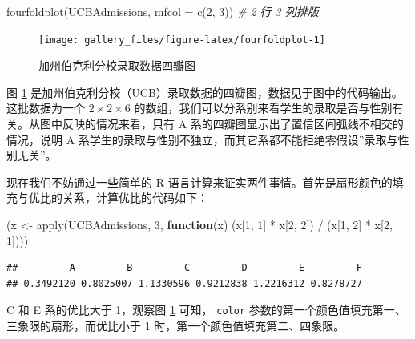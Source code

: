 \documentclass[
  b5paper,
  UTF8,twoside]{book}
\newenvironment{Shaded}{\begin{snugshade}}{\end{snugshade}}
\newcommand{\AttributeTok}[1]{\textcolor[rgb]{0.77,0.63,0.00}{#1}}
\newcommand{\CommentTok}[1]{\textcolor[rgb]{0.56,0.35,0.01}{\textit{#1}}}
\newcommand{\ControlFlowTok}[1]{\textcolor[rgb]{0.13,0.29,0.53}{\textbf{#1}}}
\newcommand{\DecValTok}[1]{\textcolor[rgb]{0.00,0.00,0.81}{#1}}
\newcommand{\FunctionTok}[1]{\textcolor[rgb]{0.00,0.00,0.00}{#1}}
\newcommand{\NormalTok}[1]{#1}
\newcommand{\OtherTok}[1]{\textcolor[rgb]{0.56,0.35,0.01}{#1}}
\newcommand{\SpecialCharTok}[1]{\textcolor[rgb]{0.00,0.00,0.00}{#1}}
\begin{document}
\begin{Shaded}
\begin{Highlighting}[]
\FunctionTok{fourfoldplot}\NormalTok{(UCBAdmissions, }\AttributeTok{mfcol =} \FunctionTok{c}\NormalTok{(}\DecValTok{2}\NormalTok{, }\DecValTok{3}\NormalTok{)) }\CommentTok{\# 2 行 3 列排版}
\end{Highlighting}
\end{Shaded}

\begin{figure}

{\centering \texttt{[image: gallery\_files/figure-latex/fourfoldplot-1]} 

}

\caption[加州伯克利分校录取数据四瓣图]{加州伯克利分校录取数据四瓣图}\label{fig:fourfoldplot}
\end{figure}

图 \ref{fig:fourfoldplot} 是加州伯克利分校（UCB）录取数据的四瓣图，数据见于图中的代码输出。这批数据为一个 \(2\times2\times6\) 的数组，我们可以分系别来看学生的录取是否与性别有关。从图中反映的情况来看，只有 A 系的四瓣图显示出了置信区间弧线不相交的情况，说明 A 系学生的录取与性别不独立，而其它系都不能拒绝零假设''录取与性别无关''。

现在我们不妨通过一些简单的 R 语言计算来证实两件事情。首先是扇形颜色的填充与优比的关系，计算优比的代码如下：

\begin{Shaded}
\begin{Highlighting}[]
\NormalTok{(x }\OtherTok{\textless{}{-}} \FunctionTok{apply}\NormalTok{(UCBAdmissions, }\DecValTok{3}\NormalTok{, }\ControlFlowTok{function}\NormalTok{(x) (x[}\DecValTok{1}\NormalTok{, }\DecValTok{1}\NormalTok{] }\SpecialCharTok{*}\NormalTok{ x[}\DecValTok{2}\NormalTok{, }\DecValTok{2}\NormalTok{]) }\SpecialCharTok{/}\NormalTok{ (x[}\DecValTok{1}\NormalTok{, }\DecValTok{2}\NormalTok{] }\SpecialCharTok{*}\NormalTok{ x[}\DecValTok{2}\NormalTok{, }\DecValTok{1}\NormalTok{])))}
\end{Highlighting}
\end{Shaded}

\begin{verbatim}
##         A         B         C         D         E         F 
## 0.3492120 0.8025007 1.1330596 0.9212838 1.2216312 0.8278727
\end{verbatim}

C 和 E 系的优比大于 1，观察图 \ref{fig:fourfoldplot} 可知， \texttt{color} 参数的第一个颜色值填充第一、三象限的扇形，而优比小于 1 时，第一个颜色值填充第二、四象限。
\end{document}
